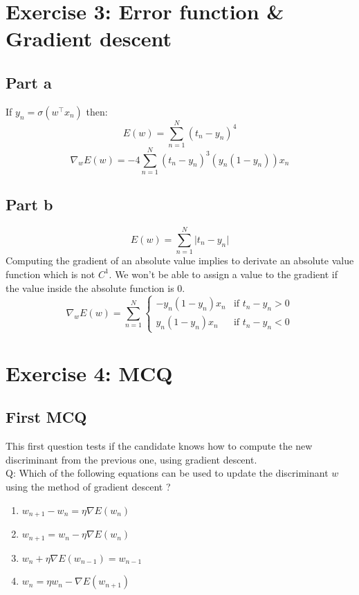 \documentclass[a4paper, 10pt]{article}
\begin{document}
\section{Exercise 3: Error function \& Gradient descent}
\subsection{Part a}
If $y_n = \sigma(w^\top x_n)$ then:
$$
E(w) = \sum_{n=1}^N (t_n-y_n)^4
$$
$$
\nabla_w E(w) = -4\sum_{n=1}^N (t_n-y_n)^3(y_n (1-y_n))x_n
$$

\subsection{Part b}
$$
E(w) = \sum_{n=1}^N \vert t_n - y_n \vert
$$
Computing the gradient of an absolute value implies to derivate an
absolute value function which  is not $C^1$. We won't be able to assign 
a value to the gradient if the value inside the absolute function is 0.
$$
\nabla_w E(w) = \sum_{n=1}^N \left\{ \begin{array}{ll}  
                    -y_n(1-y_n)x_n & \text{if $t_n-y_n > 0$}
                \\ 
                    y_n(1-y_n)x_n & \text{if $t_n-y_n < 0$}
                        \end{array}
                \right.
$$

\section{Exercise 4: MCQ}
\subsection{First MCQ}
This first question tests if the candidate knows how to compute the new
discriminant from the previous one, using gradient descent.
\\
Q: Which of the following equations can be used to update the discriminant $w$ using
the method of gradient descent ?
\\
\begin{enumerate}
    \item $w_{n+1} - w_{n} =  \eta \nabla E(w_{n})$
    \item $w_{n+1} = w_{n} - \eta \nabla E(w_{n})$
    \item $w_{n} + \eta \nabla E(w_{n-1}) = w_{n-1} $
    \item $w_{n} = \eta w_{n} - \nabla E(w_{n+1})$
\end{enumerate}
\end{document}
